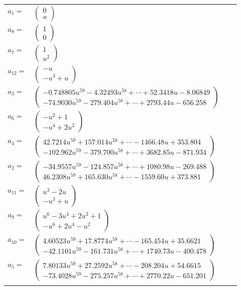 \documentclass[1p]{elsarticle_modified}
\theoremstyle{definition}
\begin{document}
\begin{tabular}{m{7pt} m{180pt} m{7pt} m{180pt} }
\flushright $a_{1}=$&$\begin{pmatrix}0\\u\end{pmatrix}$ \\
\flushright $a_{8}=$&$\begin{pmatrix}1\\0\end{pmatrix}$ \\
\flushright $a_{7}=$&$\begin{pmatrix}1\\u^2\end{pmatrix}$ \\
\flushright $a_{12}=$&$\begin{pmatrix}- u\\- u^3+u\end{pmatrix}$ \\
\flushright $a_{3}=$&$\begin{pmatrix}-0.748805 u^{59}-4.32493 u^{58}+\cdots+52.3418 u-8.06849\\-74.9030 u^{59}-279.404 u^{58}+\cdots+2793.44 u-656.258\end{pmatrix}$ \\
\flushright $a_{6}=$&$\begin{pmatrix}- u^2+1\\- u^4+2 u^2\end{pmatrix}$ \\
\flushright $a_{4}=$&$\begin{pmatrix}42.7214 u^{59}+157.014 u^{58}+\cdots-1466.48 u+353.804\\-102.962 u^{59}-379.700 u^{58}+\cdots+3682.85 u-871.934\end{pmatrix}$ \\
\flushright $a_{2}=$&$\begin{pmatrix}-34.9557 u^{59}-124.857 u^{58}+\cdots+1080.98 u-269.488\\46.2308 u^{59}+165.630 u^{58}+\cdots-1559.60 u+373.881\end{pmatrix}$ \\
\flushright $a_{11}=$&$\begin{pmatrix}u^3-2 u\\- u^3+u\end{pmatrix}$ \\
\flushright $a_{9}=$&$\begin{pmatrix}u^6-3 u^4+2 u^2+1\\- u^6+2 u^4- u^2\end{pmatrix}$ \\
\flushright $a_{10}=$&$\begin{pmatrix}4.60523 u^{59}+17.8774 u^{58}+\cdots-165.454 u+35.6621\\-42.1101 u^{59}-161.731 u^{58}+\cdots+1740.73 u-400.478\end{pmatrix}$ \\
\flushright $a_{5}=$&$\begin{pmatrix}7.80133 u^{59}+27.2592 u^{58}+\cdots-208.204 u+54.6615\\-73.4028 u^{59}-275.257 u^{58}+\cdots+2770.22 u-651.201\end{pmatrix}$\\&\end{tabular}
\end{document}
